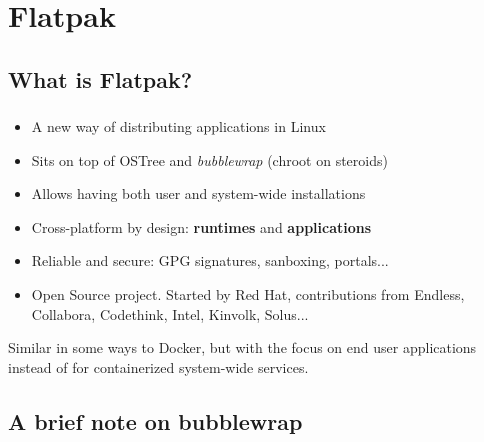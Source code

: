 %
%
%

\section{Flatpak}
\subsection{What is Flatpak?}

\begin{frame}
  \frametitle{\insertsubsection}

    \begin{itemize}
    \item A new way of distributing applications in Linux\vspacing
    \item Sits on top of OSTree and \textit{bubblewrap} (chroot on steroids)\vspacing
    \item Allows having both user and system-wide installations\vspacing
    \item Cross-platform by design: \textbf{runtimes} and \textbf{applications}\vspacing
    \item Reliable and secure: GPG signatures, sanboxing, portals...\vspacing
    \item Open Source project. Started by Red Hat, contributions from Endless, Collabora, Codethink, Intel, Kinvolk, Solus...
    \end{itemize}

    \begin{flushleft}
      Similar in some ways to Docker, but with the focus on end user
      applications instead of for containerized system-wide services.
    \end{flushleft}
\end{frame}

\subsection{A brief note on bubblewrap}

